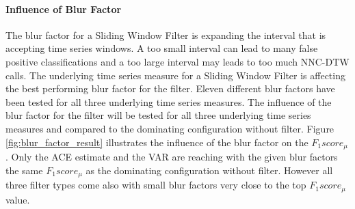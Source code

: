\paragraph{Influence of Blur Factor} \label{influence_of_blur_factor}
The blur factor for a Sliding Window Filter is expanding the interval that is accepting time series windows. A too small
interval can lead to many false positive classifications and a too large interval may leads to too much NNC-DTW calls.
The underlying time series measure for a Sliding Window Filter is affecting the best performing blur factor for the
filter. Eleven different blur factors have been tested for all three underlying time series measures. The influence of
the blur factor for the filter will be tested for all three underlying time series measures and compared to the
dominating configuration without filter. Figure \ref{fig:blur_factor_result} illustrates the influence of the blur
factor on the $F_{1}score_{\mu}$. Only the ACE estimate and the VAR are reaching with the given blur factors the same
$F_{1}score_{\mu}$ as the dominating configuration without filter. However all three filter types come also with small
blur factors very close to the top $F_{1}score_{\mu}$ value.

